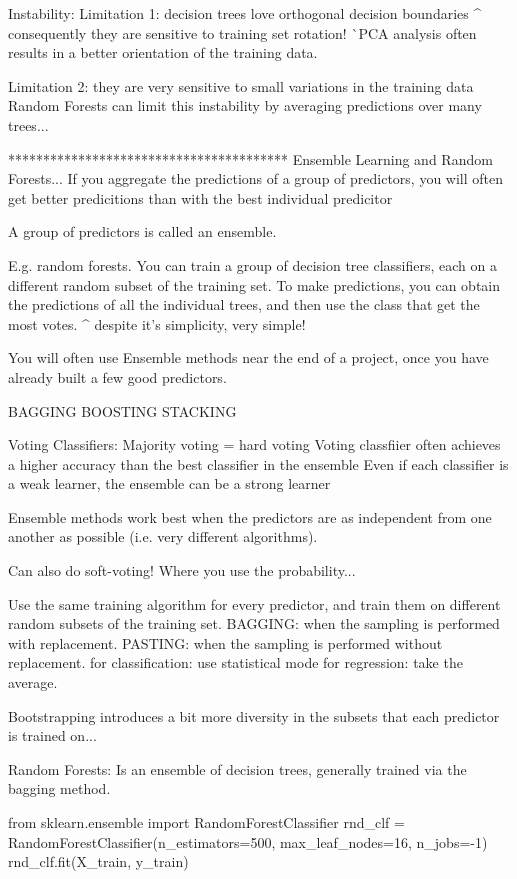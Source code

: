 Instability:
Limitation 1: decision trees love orthogonal decision boundaries
^ consequently they are sensitive to training set rotation!
^^ PCA analysis often results in a better orientation of the training data.

Limitation 2: they are very sensitive to small variations in the training data
Random Forests can limit this instability by averaging predictions over many trees...

****************************************
Ensemble Learning and Random Forests...
If you aggregate the predictions of a group of predictors,
you will often get better predicitions than with the best individual predicitor

A group of predictors is called an ensemble.

E.g. random forests.
You can train a group of decision tree classifiers,
each on a different random subset of the training set.
To make predictions, you can obtain the predictions of all the individual trees,
and then use the class that get the most votes.
^ despite it's simplicity, very simple!

You will often use Ensemble methods near the end of a project,
once you have already built a few good predictors.

BAGGING
BOOSTING
STACKING

Voting Classifiers:
Majority voting = hard voting
Voting classfiier often achieves a higher accuracy than the best classifier in the ensemble
Even if each classifier is a weak learner,
the ensemble can be a strong learner

Ensemble methods work best when the predictors are
as independent from one another as possible (i.e. very different algorithms).

Can also do soft-voting! Where you use the probability...


Use the same training algorithm for every predictor,
and train them on different random subsets of the training set.
BAGGING: when the sampling is performed with replacement.
PASTING: when the sampling is performed without replacement.
for classification: use statistical mode
for regression: take the average.

Bootstrapping introduces a bit more diversity in the subsets that each predictor is trained on...

Random Forests:
Is an ensemble of decision trees, generally trained via the bagging method.

from sklearn.ensemble import RandomForestClassifier
rnd_clf = RandomForestClassifier(n_estimators=500, max_leaf_nodes=16, n_jobs=-1)
rnd_clf.fit(X_train, y_train)

